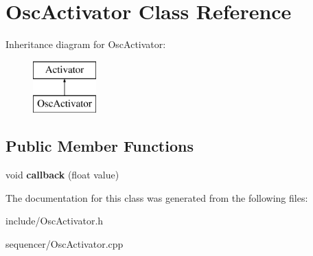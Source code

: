 \hypertarget{classOscActivator}{\section{Osc\-Activator Class Reference}
\label{classOscActivator}
}
Inheritance diagram for Osc\-Activator\-:\begin{figure}[H]
\begin{center}
\leavevmode
\includegraphics[height=2.000000cm]{classOscActivator}
\end{center}
\end{figure}
\subsection*{Public Member Functions}
\begin{DoxyCompactItemize}
\item 
\hypertarget{classOscActivator_ad5852376e949408b2fc13c8adf60c032}{void {\bfseries callback} (float value)}\label{classOscActivator_ad5852376e949408b2fc13c8adf60c032}

\end{DoxyCompactItemize}


The documentation for this class was generated from the following files\-:\begin{DoxyCompactItemize}
\item 
include/Osc\-Activator.\-h\item 
sequencer/Osc\-Activator.\-cpp\end{DoxyCompactItemize}
